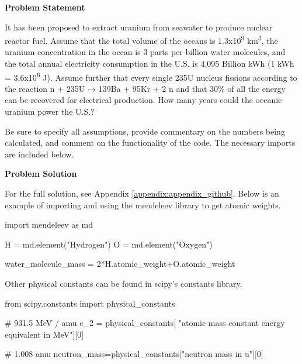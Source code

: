 \label{nuclear_assignment_1}

\begin{tcolorbox}[breakable, enhanced jigsaw, title=NE 495: Assignment \ref{nuclear_assignment_1}, 
    colframe=ksu-purple, colback=ksu-gray]

    \textbf{Problem Statement}
    \parindent15pt

    It has been proposed to extract uranium from seawater to produce nuclear reactor fuel. 
    Assume that the total volume of the oceans is 1.3x10\textsuperscript{9} km\textsuperscript{3}, the uranium 
    concentration in the ocean is 3 parts per billion water molecules, and the total annual 
    electricity consumption in the U.S. is 4,095 Billion kWh (1 kWh = 3.6x10\textsuperscript{6} J). Assume further 
    that every single 235U nucleus fissions according to the reaction n + 235U → 139Ba + 95Kr + 2 n 
    and that 30\% of all the energy can be recovered for electrical production. How many years could the oceanic 
    uranium power the U.S.?

    Be sure to specify all assumptions, provide commentary on the numbers being calculated, and comment on the 
    functionality of the code. The necessary imports are included below.

    \tcblower
    \textbf{Problem Solution}
    \parindent15pt

    For the full solution, see Appendix \ref{appendix:appendix_github}. Below is an example of 
    importing and using the mendeleev library to get atomic weights.

\begin{python}
import mendeleev as md

H = md.element("Hydrogen")
O = md.element("Oxygen")

water_molecule_mass = 2*H.atomic_weight+O.atomic_weight
\end{python}

Other physical constants can be found in scipy's constants library.

\begin{python}
from scipy.constants import physical_constants

# 931.5 MeV / amu
c_2 = physical_constants[
    "atomic mass constant energy equivalent in MeV"][0]

# 1.008 amu
neutron_mass=physical_constants["neutron mass in u"][0]
\end{python}

\end{tcolorbox}

